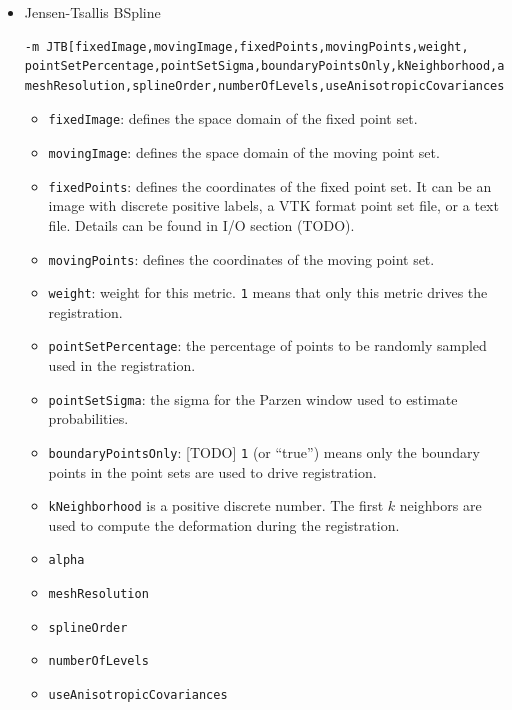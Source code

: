 \begin{itemize}
    \item Jensen-Tsallis BSpline
    \begin{verbatim}
-m JTB[fixedImage,movingImage,fixedPoints,movingPoints,weight,
pointSetPercentage,pointSetSigma,boundaryPointsOnly,kNeighborhood,alpha,
meshResolution,splineOrder,numberOfLevels,useAnisotropicCovariances] 
    \end{verbatim}
    \begin{itemize}
        \item \verb"fixedImage": defines the space domain of the fixed point set.
        \item \verb"movingImage": defines the space domain of the moving point set.
        \item \verb"fixedPoints": defines the coordinates of the fixed point set. It can be an image with discrete positive labels, a VTK format point set file, or a text file. Details can be found in I/O section (TODO).
        \item \verb"movingPoints": defines the coordinates of the moving point set.
        \item \verb"weight": weight for this metric. \verb"1" means that only this metric drives the registration.
        \item \verb"pointSetPercentage": the percentage of points to be randomly sampled used in the registration.
        \item \verb"pointSetSigma": the sigma for the Parzen window used to estimate probabilities.  
        \item \verb"boundaryPointsOnly": [TODO] \verb"1" (or ``true'') means only the boundary points in the point sets are used to drive registration.
        \item \verb"kNeighborhood" is a positive discrete number. The first $k$ neighbors are used to compute the deformation during the registration. 
        \item \verb"alpha"
        \item \verb"meshResolution"
        \item \verb"splineOrder"
        \item \verb"numberOfLevels"
        \item \verb"useAnisotropicCovariances"
    \end{itemize}

\end{itemize}


